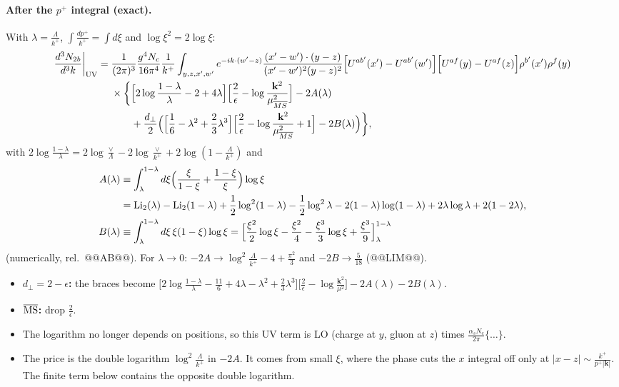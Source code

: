 \documentclass[10pt]{article}
\numberwithin{equation}{section}
\begin{document}
\paragraph{After the $p^+$ integral (exact).} With $\lambda=\frac{\Lambda}{k^+}$, $\int\frac{dp^+}{k^+}=\int d\xi$ and $\log\xi^2=2\log\xi$:
\begin{align}
\frac{d^{3}N_{2b}}{d^{3}k}\bigg|_{\rm UV}={}&\frac{1}{(2\pi)^{3}}\frac{g^{4}N_{c}}{16\pi^{4}}\frac{1}{k^{+}}\int_{y,z,x',w'}e^{-ik\cdot(w'-z)}\frac{(x'-w')\cdot(y-z)}{(x'-w')^{2}(y-z)^{2}}\Big[U^{ab'}(x')-U^{ab'}(w')\Big]\Big[U^{af}(y)-U^{af}(z)\Big]\rho^{b'}(x')\rho^{f}(y)\notag\\
&\times\bigg\{\Big[2\log\frac{1-\lambda}{\lambda}-2+4\lambda\Big]\Big[\frac2\epsilon-\log\frac{\mathbf k^2}{\mu^2_{\overline{MS}}}\Big]-2A(\lambda)\notag\\
&\qquad+\frac{d_\perp}{2}\Big(\Big[\frac16-\lambda^2+\frac23\lambda^3\Big]\Big[\frac2\epsilon-\log\frac{\mathbf k^2}{\mu^2_{\overline{MS}}}+1\Big]-2B(\lambda)\Big)\bigg\},
\label{eq:UV}
\end{align}
with $2\log\frac{1-\lambda}{\lambda}=2\log\frac{\vee}{\Lambda}-2\log\frac{\vee}{k^+}+2\log(1-\frac{\Lambda}{k^+})$ and
\begin{align}
A(\lambda)&\equiv\int_\lambda^{1-\lambda}d\xi\Big(\frac{\xi}{1-\xi}+\frac{1-\xi}{\xi}\Big)\log\xi\notag\\
&=\mathrm{Li}_2(\lambda)-\mathrm{Li}_2(1-\lambda)+\frac12\log^2(1-\lambda)-\frac12\log^2\lambda-2(1-\lambda)\log(1-\lambda)+2\lambda\log\lambda+2(1-2\lambda),\notag\\
B(\lambda)&\equiv\int_\lambda^{1-\lambda}d\xi\,\xi(1-\xi)\log\xi=\Big[\frac{\xi^2}{2}\log\xi-\frac{\xi^2}{4}-\frac{\xi^3}{3}\log\xi+\frac{\xi^3}{9}\Big]_{\lambda}^{1-\lambda}
\end{align}
(numerically, rel.\ @@AB@@). For $\lambda\to0$: $-2A\to\log^2\frac{\Lambda}{k^+}-4+\frac{\pi^2}{3}$ and $-2B\to\frac{5}{18}$ (@@LIM@@).
\begin{itemize}
\item \textbf{$d_\perp=2-\epsilon$:} the braces become $\big[2\log\frac{1-\lambda}{\lambda}-\frac{11}{6}+4\lambda-\lambda^2+\frac23\lambda^3\big]\big[\frac2\epsilon-\log\frac{\mathbf k^2}{\mu^2}\big]-2A(\lambda)-2B(\lambda)$.
\item \textbf{$\overline{\rm MS}$:} drop $\frac{2}{\epsilon}$.
\item The logarithm no longer depends on positions, so this UV term is LO (charge at $y$, gluon at $z$) times $\frac{\alpha_sN_c}{2\pi}\{\dots\}$.
\item The price is the double logarithm $\log^2\frac{\Lambda}{k^+}$ in $-2A$. It comes from small $\xi$, where the phase cuts the $x$ integral off only at $|x-z|\sim\frac{k^+}{p^+|\mathbf k|}$. The finite term below contains the opposite double logarithm.
\end{itemize}
\end{document}
